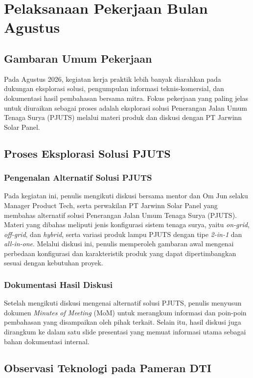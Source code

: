 \cleardoublepage
\chapter{Pelaksanaan Pekerjaan Bulan Agustus}
\label{chap:pekerjaan-agustus}
\section{Gambaran Umum Pekerjaan}
Pada Agustus 2026, kegiatan kerja praktik lebih banyak diarahkan pada dukungan eksplorasi solusi, pengumpulan informasi teknis-komersial, dan dokumentasi hasil pembahasan bersama mitra. Fokus pekerjaan yang paling jelas untuk diuraikan sebagai proses adalah eksplorasi solusi Penerangan Jalan Umum Tenaga Surya (PJUTS) melalui materi produk dan diskusi dengan PT Jarwinn Solar Panel.

\section{Proses Eksplorasi Solusi PJUTS}
\subsection{Pengenalan Alternatif Solusi PJUTS}
Pada kegiatan ini, penulis mengikuti diskusi bersama mentor dan Om Jun selaku Manager Product Tech, serta perwakilan PT Jarwinn Solar Panel yang membahas alternatif solusi Penerangan Jalan Umum Tenaga Surya (PJUTS). Materi yang dibahas meliputi jenis konfigurasi sistem tenaga surya, yaitu \textit{on-grid}, \textit{off-grid}, dan \textit{hybrid}, serta variasi produk lampu PJUTS dengan tipe \textit{2-in-1} dan \textit{all-in-one}. Melalui diskusi ini, penulis memperoleh gambaran awal mengenai perbedaan konfigurasi dan karakteristik produk yang dapat dipertimbangkan sesuai dengan kebutuhan proyek.

\subsection{Dokumentasi Hasil Diskusi}
Setelah mengikuti diskusi mengenai alternatif solusi PJUTS, penulis menyusun dokumen \textit{Minutes of Meeting} (MoM) untuk merangkum informasi dan poin-poin pembahasan yang disampaikan oleh pihak terkait. Selain itu, hasil diskusi juga dirangkum ke dalam satu slide presentasi yang memuat informasi utama sebagai bahan dokumentasi internal.

\section{Observasi Teknologi pada Pameran DTI}
